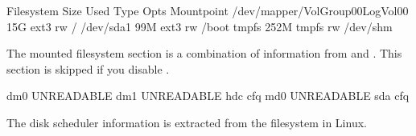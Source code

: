 \documentclass[letterpaper,10pt,english]{sphinxmanual}
\begin{document}
\begin{sphinxVerbatim}[commandchars=\\\{\}]
  Filesystem                       Size Used Type  Opts Mountpoint
  /dev/mapper/VolGroup00\PYGZhy{}LogVol00   15G  \PYGZpc{} ext3  rw   /
  /dev/sda1                         99M  \PYGZpc{} ext3  rw   /boot
  tmpfs                            252M   \PYGZpc{} tmpfs rw   /dev/shm
\end{sphinxVerbatim}

\sphinxAtStartPar
The mounted filesystem section is a combination of information from  and
. This section is skipped if you disable {\hyperref[\detokenize{mariadb-system-summary:cmdoption-mariadb-system-summary-summarize-mounts}]{}}.

\begin{sphinxVerbatim}[commandchars=\\\{\}]
        dm\PYGZhy{}0  UNREADABLE
        dm\PYGZhy{}1  UNREADABLE
         hdc  \PYG{o}{[}cfq\PYG{o}{]} 
         md0  UNREADABLE
         sda  \PYG{o}{[}cfq\PYG{o}{]} 
\end{sphinxVerbatim}

\sphinxAtStartPar
The disk scheduler information is extracted from the  filesystem in
Linux.
\end{document}
